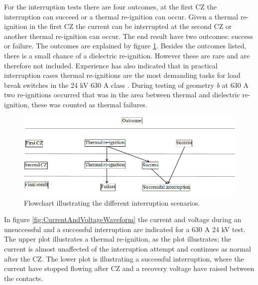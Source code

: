 \documentclass[10pt,a4paper,twoside]{article}
\begin{document}
For the interruption tests there are four outcomes, at the first CZ the interruption can succeed or a thermal re-ignition can occur. Given a thermal re-ignition in the first CZ the current can be interrupted at the second CZ or another thermal re-ignition can occur. The end result have two outcomes: success or failure. The outcomes are explained by figure \ref{fig:pilSuccessOfFail}. Besides the outcomes listed, there is a small chance of a dielectric re-ignition. However these are rare and are therefore not included. Experience has also indicated that in practical interruption cases thermal re-ignitions are the most demanding tasks for load break switches in the 24 kV 630 A class \cite{bib:AFIMVLBA}. During testing of geometry \textit{b} at 630 A two re-ignitions occurred that was in the area between thermal and dielectric re-ignition, these was counted as thermal failures.

\begin{figure}[H]
\centering
\includegraphics[scale=0.6]{Bilder/Results/interruptionFlowChart.png}
\caption{Flowchart illustrating the different interruption scenarios.} \label{fig:pilSuccessOfFail}
\end{figure}

In figure \ref{fig:CurrentAndVoltageWaveform} the current and voltage during an unsuccessful and a successful interruption are indicated for a 630 A 24 kV test. The upper plot illustrates a thermal re-ignition, as the plot illustrates; the current is almost unaffected of the interruption attempt and continues as normal after the CZ. The lower plot is illustrating a successful interruption, where the current have stopped flowing after CZ and a recovery voltage have raised between the contacts.
\end{document}
